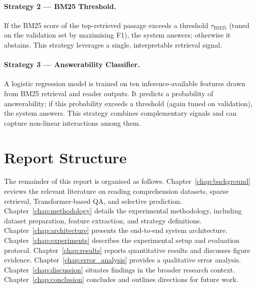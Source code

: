 \paragraph{Strategy 2 — BM25 Threshold.}
If the BM25 score of the top-retrieved passage exceeds a threshold $\tau_{\text{BM25}}$
(tuned on the validation set by maximising F1), the system answers; otherwise
it abstains. This strategy leverages a single, interpretable retrieval signal.

\paragraph{Strategy 3 — Answerability Classifier.}
A logistic regression model is trained on ten inference-available features drawn from BM25
retrieval and reader outputs. It predicts a probability of answerability; if
this probability exceeds a threshold (again tuned on validation), the system
answers. This strategy combines complementary signals and can capture
non-linear interactions among them.

\section{Report Structure}
\label{sec:intro_structure}

The remainder of this report is organised as follows.
Chapter~\ref{chap:background} reviews the relevant literature on reading
comprehension datasets, sparse retrieval, Transformer-based QA, and selective
prediction.
Chapter~\ref{chap:methodology} details the experimental methodology, including
dataset preparation, feature extraction, and strategy definitions.
Chapter~\ref{chap:architecture} presents the end-to-end system architecture.
Chapter~\ref{chap:experiments} describes the experimental setup and evaluation
protocol.
Chapter~\ref{chap:results} reports quantitative results and discusses figure
evidence.
Chapter~\ref{chap:error_analysis} provides a qualitative error analysis.
Chapter~\ref{chap:discussion} situates findings in the broader research context.
Chapter~\ref{chap:conclusion} concludes and outlines directions for future work.
